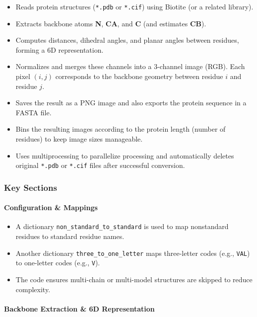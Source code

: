 \documentclass[11pt]{article}
\begin{document}
\begin{itemize}
  \item Reads protein structures (\texttt{*.pdb} or \texttt{*.cif}) using Biotite (or a related library).
  \item Extracts backbone atoms \textbf{N}, \textbf{CA}, and \textbf{C} (and estimates \textbf{CB}).
  \item Computes distances, dihedral angles, and planar angles between residues, forming a 6D representation.
  \item Normalizes and merges these channels into a 3-channel image (RGB). Each pixel $(i,j)$ corresponds to the backbone geometry between residue $i$ and residue $j$.
  \item Saves the result as a PNG image and also exports the protein sequence in a FASTA file.
  \item Bins the resulting images according to the protein length (number of residues) to keep image sizes manageable.
  \item Uses multiprocessing to parallelize processing and automatically deletes original \texttt{*.pdb} or \texttt{*.cif} files after successful conversion.
\end{itemize}

\subsubsection*{Key Sections}

\paragraph{Configuration \& Mappings}
\begin{itemize}
  \item A dictionary \texttt{non\_standard\_to\_standard} is used to map nonstandard residues to standard residue names.
  \item Another dictionary \texttt{three\_to\_one\_letter} maps three-letter codes (e.g., \texttt{VAL}) to one-letter codes (e.g., \texttt{V}).
  \item The code ensures multi-chain or multi-model structures are skipped to reduce complexity.
\end{itemize}

\paragraph{Backbone Extraction \& 6D Representation}
\end{document}
